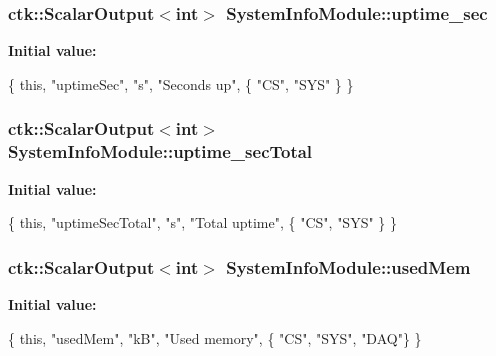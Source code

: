 \subsubsection[{\texorpdfstring{uptime\+\_\+sec}{uptime_sec}}]{\setlength{\rightskip}{0pt plus 5cm}ctk\+::\+Scalar\+Output$<$int$>$ System\+Info\+Module\+::uptime\+\_\+sec}\hypertarget{classSystemInfoModule_af6f5afca2c2c21512f1ce728436862b4}{}\label{classSystemInfoModule_af6f5afca2c2c21512f1ce728436862b4}
{\bfseries Initial value\+:}
\begin{DoxyCode}
\{ \textcolor{keyword}{this}, \textcolor{stringliteral}{"uptimeSec"}, \textcolor{stringliteral}{"s"}, \textcolor{stringliteral}{"Seconds up"},
    \{ \textcolor{stringliteral}{"CS"}, \textcolor{stringliteral}{"SYS"} \} \}
\end{DoxyCode}
\subsubsection[{\texorpdfstring{uptime\+\_\+sec\+Total}{uptime_secTotal}}]{\setlength{\rightskip}{0pt plus 5cm}ctk\+::\+Scalar\+Output$<$int$>$ System\+Info\+Module\+::uptime\+\_\+sec\+Total}\hypertarget{classSystemInfoModule_a9f4828355de8c48f5bbc46d279522298}{}\label{classSystemInfoModule_a9f4828355de8c48f5bbc46d279522298}
{\bfseries Initial value\+:}
\begin{DoxyCode}
\{ \textcolor{keyword}{this}, \textcolor{stringliteral}{"uptimeSecTotal"}, \textcolor{stringliteral}{"s"}, \textcolor{stringliteral}{"Total uptime"},
      \{ \textcolor{stringliteral}{"CS"}, \textcolor{stringliteral}{"SYS"} \} \}
\end{DoxyCode}
\subsubsection[{\texorpdfstring{used\+Mem}{usedMem}}]{\setlength{\rightskip}{0pt plus 5cm}ctk\+::\+Scalar\+Output$<$int$>$ System\+Info\+Module\+::used\+Mem}\hypertarget{classSystemInfoModule_a097cf6f7cd0a89bbc09f3cd1abd48fe5}{}\label{classSystemInfoModule_a097cf6f7cd0a89bbc09f3cd1abd48fe5}
{\bfseries Initial value\+:}
\begin{DoxyCode}
\{ \textcolor{keyword}{this}, \textcolor{stringliteral}{"usedMem"}, \textcolor{stringliteral}{"kB"}, \textcolor{stringliteral}{"Used memory"},
    \{ \textcolor{stringliteral}{"CS"}, \textcolor{stringliteral}{"SYS"}, \textcolor{stringliteral}{"DAQ"}\} \}
\end{DoxyCode}
